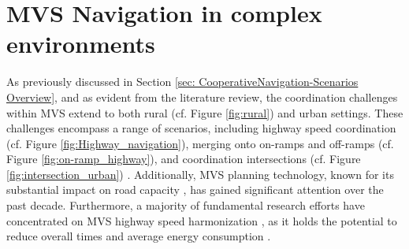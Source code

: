 \section{MVS Navigation in complex environments} \label{sec:review_MVS_application}
As previously discussed in Section \ref{sec: CooperativeNavigation-Scenarios Overview}, and as evident from the literature review, the coordination challenges within MVS extend to both rural (cf. Figure \ref{fig:rural}) and urban settings. These challenges encompass a range of scenarios, including highway speed coordination (cf. Figure \ref{fig:Highway_navigation}), merging onto on-ramps and off-ramps (cf. Figure \ref{fig:on-ramp_highway}), and coordination intersections (cf. Figure \ref{fig:intersection_urban}) \cite{bernardin2019scenario}\cite{guo2019urban}\cite{wang2019survey}\cite{7562449}.  Additionally, MVS planning technology, known for its substantial impact on road capacity \cite{amoozadeh2015platoon}\cite{zhao2013simulation}, has gained significant attention over the past decade. Furthermore, a majority of fundamental research efforts have concentrated on MVS highway speed harmonization \cite{hegyi2005optimal}\cite{papageorgiou2008effects}\cite{ma2016freeway}\cite{talebpour2013speed}, as it holds the potential to reduce overall times and average energy consumption \cite{VAHIDI2018822}. 






